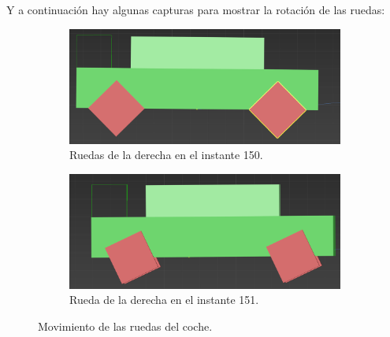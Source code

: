 Y a continuación hay algunas capturas para mostrar la rotación de las ruedas:

\begin{figure}[H]
    \centering
    \begin{subfigure}[t]{0.48\textwidth}
        \centering
        \includegraphics[width=\textwidth]{imagenes/coche/ruedas/antes.png}
        \caption{Ruedas de la derecha en el instante 150.}
    \end{subfigure}
    \hfill
    \begin{subfigure}[t]{0.48\textwidth}
        \centering
        \includegraphics[width=\textwidth]{imagenes/coche/ruedas/despues.png}
        \caption{Rueda de la derecha en el instante 151.}
    \end{subfigure}
    \caption{Movimiento de las ruedas del coche.}
\end{figure}